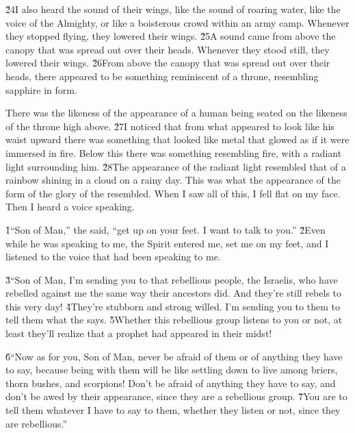 \v{24}I also heard the sound of their wings, like the sound of roaring water, like the voice of the Almighty, or like a boisterous crowd within an army camp. Whenever they stopped flying, they lowered their wings. \v{25}A sound came from above the canopy that was spread out over their heads. Whenever they stood still, they lowered their wings. \v{26}From above the canopy that was spread out over their heads, there appeared to be something reminiscent of a throne, resembling sapphire in form.

There was the likeness of the appearance of a human being seated on the likeness of the throne high above. \v{27}I noticed that from what appeared to look like his waist upward there was something that looked like metal that glowed as if it were immersed in fire. Below this there was something resembling fire, with a radiant light surrounding him. \v{28}The appearance of the radiant light resembled that of a rainbow shining in a cloud on a rainy day. This was what the appearance of the form of the glory of the  resembled. When I saw all of this, I fell flat on my face. Then I heard a voice speaking.

\v{1}``Son of Man,'' the  said, ``get up on your feet. I want to talk to you.'' \v{2}Even while he was speaking to me, the Spirit entered me, set me on my feet, and I listened to the voice that had been speaking to me.

\v{3}``Son of Man, I'm sending you to that rebellious people, the Israelis, who have rebelled against me the same way their ancestors did. And they're still rebels to this very day! \v{4}They're stubborn and strong willed. I'm sending you to them to tell them what the  says. \v{5}Whether this rebellious group listens to you or not, at least they'll realize that a prophet had appeared in their midst!

\v{6}``Now as for you, Son of Man, never be afraid of them or of anything they have to say, because being with them will be like settling down to live among briers, thorn bushes, and scorpions! Don't be afraid of anything they have to say, and don't be awed by their appearance, since they are a rebellious group. \v{7}You are to tell them whatever I have to say to them, whether they listen or not, since they are rebellious.''


